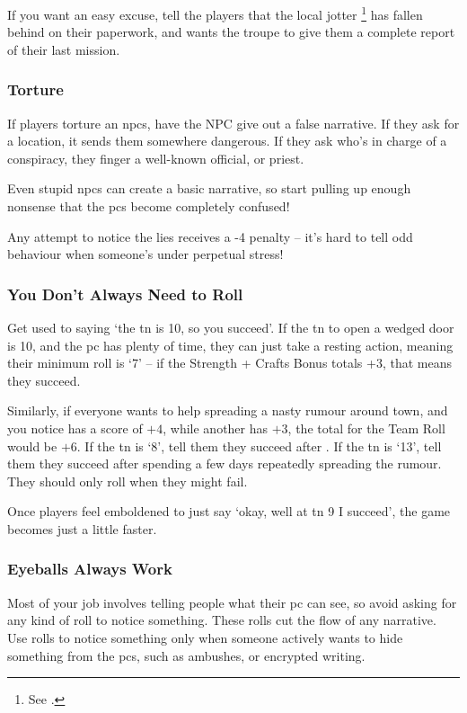 \begin{multicols}{2}
If you want an easy excuse, tell the players that the local jotter%
\footnote{See .}
has fallen behind on their paperwork, and wants the troupe to give them a complete report of their last mission.

\subsubsection{Torture}

If players torture an \glspl{npc}, have the NPC give out a false narrative.
If they ask for a location, it sends them somewhere dangerous.
If they ask who's in charge of a conspiracy, they finger a well-known official, or priest.

Even stupid \glspl{npc} can create a basic narrative, so start pulling up enough nonsense that the \glspl{pc} become completely confused!

Any attempt to notice the lies receives a -4 penalty -- it's hard to tell odd behaviour when someone's under perpetual stress!

\subsubsection{You Don't Always Need to Roll}

Get used to saying `the \gls{tn} is 10, so you succeed'.
If the \gls{tn} to open a wedged door is 10, and the \gls{pc} has plenty of time, they can just take a resting action, meaning their minimum roll is `7' -- if the Strength + Crafts Bonus totals +3, that means they succeed.

Similarly, if everyone wants to help spreading a nasty rumour around town, and you notice  has a  score of $+4$, while another has $+3$, the total for the Team Roll would be $+6$.
If the \gls{tn} is `8', tell them they succeed after .
If the \gls{tn} is `13', tell them they succeed after spending a few days repeatedly spreading the rumour.
They should only roll when they might fail.

Once players feel emboldened to just say `okay, well at \gls{tn} 9 I succeed', the game becomes just a little faster.

\subsubsection{Eyeballs Always Work}

Most of your job involves telling people what their \gls{pc} can see, so avoid asking for any kind of roll to notice something.
These rolls cut the flow of any narrative.
Use rolls to notice something only when someone actively wants to hide something from the \glspl{pc}, such as ambushes, or encrypted writing.


\end{multicols}
